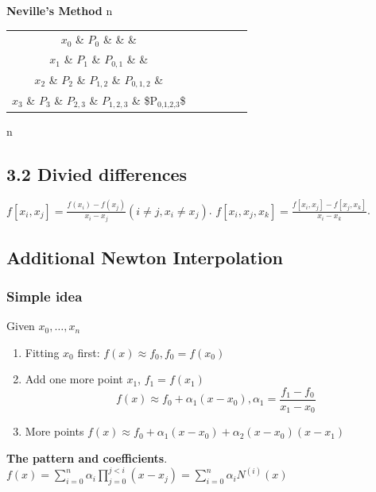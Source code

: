 \documentclass[11pt]{article}
\begin{document}
\textbf{Neville's Method}
n   \begin{tabular}{c c c c c c}
      \(x_0\) \& \(P_0\) \&           \&             \&            \\
      \(x_1\) \& \(P_1\) \& \(P_{0,1}\) \&             \&            \\
      \(x_2\) \& \(P_2\) \& \(P_{1,2}\) \& \(P_{0,1,2}\) \&            \\
      \(x_3\) \& \(P_3\) \& \(P_{2,3}\) \& \(P_{1,2,3}\) \& \$P\(_{\text{0,1,2,3}}\)\$\\
    \end{tabular}n
    \subsection{3.2 Divied differences}
    \label{sec:org1bd045f}
    \(f[x_i,x_j]=\frac{f(x_i)-f(x_j)}{x_i-x_j}(i\neq j, x_i\neq x_j)\).
    \(f[x_i,x_j,x_k]=\frac{f[x_i,x_j]-f[x_j,x_k]}{x_i-x_k}\).
    \subsection{Additional Newton Interpolation}
    \label{sec:orgcac1df0}
    \subsubsection{Simple idea}
    \label{sec:org97b005e}
    Given \(x_0,\dots,x_n\)
    \begin{enumerate}
    \item Fitting $x_0$ first: $f(x)\approx f_0, f_0=f(x_0)$
    \item Add one more point $x_1$, $f_1=f(x_1)$
      \begin{equation*}
        f(x) \approx f_0+\alpha_1(x-x_0),\alpha_1=\frac{f_1-f_0}{x_1-x_0}
      \end{equation*}
    \item More points $f(x)\approx f_0+\alpha_1(x-x_0)+\alpha_2(x-x_0)(x-x_1)$
    \end{enumerate}

    \textbf{The pattern and coefficients}.
    \(f(x)=\displaystyle\sum_{i=0}^n\alpha_i
    \displaystyle\prod_{j=0}^{j<i}(x-x_j)
    =\displaystyle\sum_{i=0}^n\alpha_iN^{(i)}(x)\)
\end{document}
